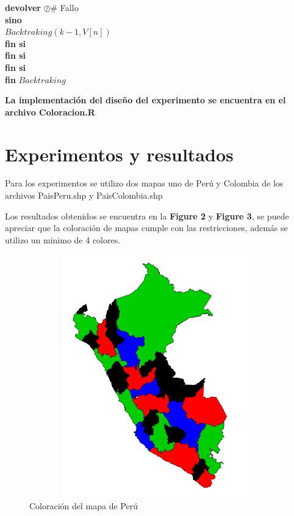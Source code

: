 \documentclass[a4paper]{article}
\begin{document}
\begin{algorithm}
	\hspace{1.6cm} \textbf{devolver} $\oslash$\hspace{1cm}\# Fallo\\
	\hspace{1.1cm} \textbf{sino}\\
	\hspace{1.6cm} $Backtraking(k - 1, V [n])$\\
	\hspace{1.1cm} \textbf{fin si}\\
	\hspace{0.6cm} \textbf{fin si}\\
	\hspace{0.1cm} \textbf{fin si}\\
	\hspace{0.1cm}\textbf{fin} $Backtraking$
\end{algorithm}

\textbf{La implementación del diseño del experimento se encuentra en el archivo Coloracion.R}

\pagebreak
\section{Experimentos y resultados}

Para los experimentos se utilizo dos mapas uno de Perú y Colombia de los archivos PaisPeru.shp y PaisColombia.shp

Los resultados obtenidos se encuentra en la \textbf{Figure 2} y \textbf{Figure 3}, se puede apreciar que la coloración de mapas cumple con las restricciones, además se utilizo un minimo de 4 colores.



\begin{figure}
	\centering
	\includegraphics[width=12.5cm,height=10.5cm]{Peru.png}
	\caption{Coloración del mapa de Perú}
	\label{FI1_1}
\end{figure}
\end{document}
